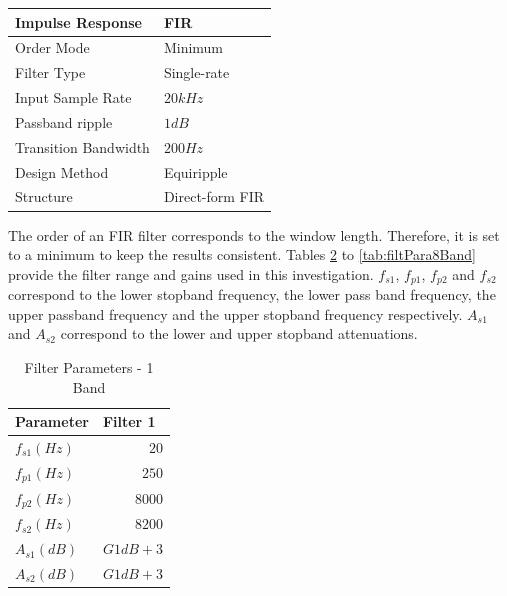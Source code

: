 \documentclass[11pt,onecolumn]{witseiepaper}
\begin{document}
\begin{appendices}
\begin{table}[htbp]
    \begin{tabular}{|l|l|}
    \hline
    Impulse Response  & FIR  \\
    \hline
    Order Mode & Minimum \\
    \hline
    Filter Type & Single-rate \\
    \hline
    Input Sample Rate & $20kHz$ \\
    \hline
    Passband ripple & $1dB$ \\
    \hline
    Transition Bandwidth & $200Hz$ \\
    \hline
    Design Method & Equiripple \\
    \hline
    Structure  & Direct-form FIR \\
    \hline
    \end{tabular}%
  \label{tab:numFilt_FiltSpec}%
\end{table}%

\noindent The order of an FIR filter corresponds to the window length. Therefore, it is set to a minimum to keep the results consistent. Tables \ref{tab:filtPara1Band} to \ref{tab:filtPara8Band} provide the filter range and gains used in this investigation. $f_{s1}$, $f_{p1}$, $f_{p2}$ and $f_{s2}$ correspond to the lower stopband frequency, the lower pass band frequency, the upper passband frequency and the upper stopband frequency respectively. $A_{s1}$ and $A_{s2}$ correspond to the lower and upper stopband attenuations.

\begin{table}[htbp]
  \centering
  \caption{Filter Parameters - 1 Band}
    \begin{tabular}{|l|l|}
    \hline
    \textbf{Parameter} & \textbf{Filter 1} \\
    \hline
    $f_{s1} (Hz)$   & \multicolumn{1}{r|}{$20$} \\
    \hline
    $f_{p1} (Hz)$   & \multicolumn{1}{r|}{$250$} \\
    \hline
    $f_{p2} (Hz)$   & \multicolumn{1}{r|}{$8000$} \\
    \hline
    $f_{s2} (Hz)$   & \multicolumn{1}{r|}{$8200$} \\
    \hline
    $A_{s1} (dB)$   & $G1dB + 3$ \\
    \hline
    $A_{s2} (dB)$   & $G1dB + 3$ \\
    \hline
    \end{tabular}%
  \label{tab:filtPara1Band}%
\end{table}%



\end{appendices}
\end{document}
